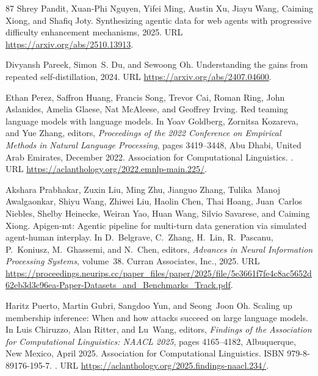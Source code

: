 \begin{thebibliography}{87}
Shrey Pandit, Xuan-Phi Nguyen, Yifei Ming, Austin Xu, Jiayu Wang, Caiming Xiong, and Shafiq Joty.
\newblock Synthesizing agentic data for web agents with progressive difficulty enhancement mechanisms, 2025.
\newblock URL \url{https://arxiv.org/abs/2510.13913}.

Divyansh Pareek, Simon~S. Du, and Sewoong Oh.
\newblock Understanding the gains from repeated self-distillation, 2024.
\newblock URL \url{https://arxiv.org/abs/2407.04600}.

Ethan Perez, Saffron Huang, Francis Song, Trevor Cai, Roman Ring, John Aslanides, Amelia Glaese, Nat McAleese, and Geoffrey Irving.
\newblock Red teaming language models with language models.
\newblock In Yoav Goldberg, Zornitsa Kozareva, and Yue Zhang, editors, \emph{Proceedings of the 2022 Conference on Empirical Methods in Natural Language Processing}, pages 3419--3448, Abu Dhabi, United Arab Emirates, December 2022. Association for Computational Linguistics.
\newblock {}.
\newblock URL \url{https://aclanthology.org/2022.emnlp-main.225/}.

Akshara Prabhakar, Zuxin Liu, Ming Zhu, Jianguo Zhang, Tulika~Manoj Awalgaonkar, Shiyu Wang, Zhiwei Liu, Haolin Chen, Thai Hoang, Juan~Carlos Niebles, Shelby Heinecke, Weiran Yao, Huan Wang, Silvio Savarese, and Caiming Xiong.
\newblock Apigen-mt: Agentic pipeline for multi-turn data generation via simulated agent-human interplay.
\newblock In D.~Belgrave, C.~Zhang, H.~Lin, R.~Pascanu, P.~Koniusz, M.~Ghassemi, and N.~Chen, editors, \emph{Advances in Neural Information Processing Systems}, volume~38. Curran Associates, Inc., 2025.
\newblock URL \url{https://proceedings.neurips.cc/paper_files/paper/2025/file/5e3661f7fe4c8ac5652d62eb3d3c96ea-Paper-Datasets_and_Benchmarks_Track.pdf}.

Haritz Puerto, Martin Gubri, Sangdoo Yun, and Seong~Joon Oh.
\newblock Scaling up membership inference: When and how attacks succeed on large language models.
\newblock In Luis Chiruzzo, Alan Ritter, and Lu~Wang, editors, \emph{Findings of the Association for Computational Linguistics: NAACL 2025}, pages 4165--4182, Albuquerque, New Mexico, April 2025. Association for Computational Linguistics.
\newblock ISBN 979-8-89176-195-7.
\newblock {}.
\newblock URL \url{https://aclanthology.org/2025.findings-naacl.234/}.


\end{thebibliography}
